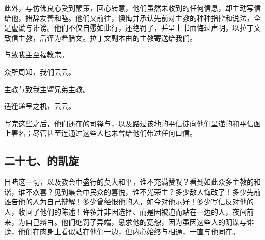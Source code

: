 此外，与仿佛良心受到鞭策，回心转意，他们虽然未收到的任何信息，却主动写信给他，措辞友善和睦。他们又前往，懊悔并承认先前对主教的种种指控和说法，全是虚谎与诽谤。他们不仅自愿如此行，还绝罚了，并呈上书面悔过声明，以拉丁文致信主教，后译为希腊文。拉丁文副本由的主教寄送给我们。\par

\par

与致我主至福教宗。\par

众所周知，我们云云。\par

\par

主教与致我主暨兄弟主教。\par

适逢递呈之机，云云。\par

写完这些之后，他们还在的司铎与，以及路过该地的平信徒向他们呈递的和平信函上署名；尽管甚至连通过这些人也未曾给他们带过任何口信。\par


\subsection{二十七、的凯旋}

目睹这一切，以及教会中盛行的莫大和平，谁不充满赞叹？看到如此众多主教的和谐，谁不欢喜？见到集会中民众的喜悦，谁不光荣主？多少敌人悔改了！多少先前诬告他的人为自己辩解！多少曾经恨他的人，如今对他示好！多少写信反对他的人，收回了他们的陈述！许多并非因选择、而是因被迫而站在一边的人，夜间前来，为自己辩白。他们绝罚了异端，恳求他的宽恕，因为虽因这些人的阴谋与诽谤，他们在肉身上看似站在他们一边，但内心始终与相通，一直与他同在。\par


